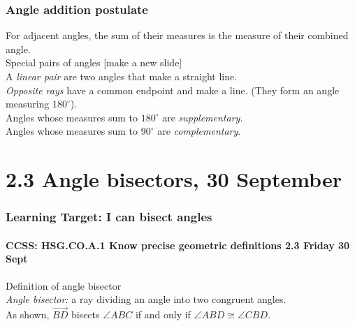 \documentclass{beamer}
\begin{document}
\frame
  {
    \frametitle{Angle addition postulate}

    For adjacent angles, the sum of their measures is the measure of their combined angle.\\
    Special pairs of angles [make a new slide]\\
    A \emph{linear pair} are two angles that make a straight line. \\
    \emph{Opposite rays} have a common endpoint and make a line. (They form an angle measuring $180^\circ$).\\
    Angles whose measures sum to $180^\circ$ are \emph{supplementary}. \\
    Angles whose measures sum to $90^\circ$ are \emph{complementary}.
    \begin{center}
      \end{center}
  }

\section{2.3 Angle bisectors, 30 September}
\frame
{
  \frametitle{Learning Target: I can bisect angles}
  \framesubtitle{CCSS: HSG.CO.A.1 Know precise geometric definitions  \hfill \alert{2.3 Friday 30 Sept}}

  Definition of angle bisector\\
  \emph{Angle bisector:} a ray dividing an angle into two congruent angles.\\[0.5cm]
  As shown, $\overrightarrow{BD}$ bisects $\angle ABC$ if and only if $\angle ABD \cong \angle CBD$. 
  \begin{center}
    \end{center}
}
\end{document}
